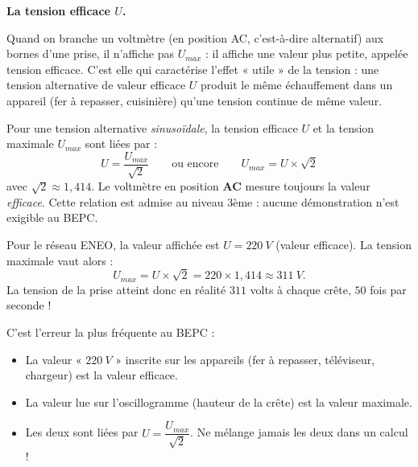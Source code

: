 \documentclass[11pt]{article}
\newcommand{\cle}[1]{{\popxbold\color{popdark}#1}}
\begin{document}
\textbf{La tension efficace $U$.}\par
Quand on branche un voltmètre (en position AC, c'est-à-dire alternatif) aux bornes d'une prise, il n'affiche pas $U_{max}$ : il affiche une valeur plus petite, appelée \cle{tension efficace}. C'est elle qui caractérise l'effet « utile » de la tension : une tension alternative de valeur efficace $U$ produit le même échauffement dans un appareil (fer à repasser, cuisinière) qu'une tension continue de même valeur.

\begin{propriete}
Pour une tension alternative \emph{sinusoïdale}, la tension efficace $U$ et la tension maximale $U_{max}$ sont liées par :
\[ U = \frac{U_{max}}{\sqrt{2}} \qquad \text{ou encore} \qquad U_{max} = U \times \sqrt{2} \]
avec $\sqrt{2} \approx 1,414$. Le voltmètre en position \textbf{AC} mesure toujours la valeur \emph{efficace}. Cette relation est admise au niveau 3ème : aucune démonstration n'est exigible au BEPC.
\end{propriete}

\begin{exemplebox}
Pour le réseau ENEO, la valeur affichée est $U = \SI{220}{V}$ (valeur efficace). La tension maximale vaut alors :
\[ U_{max} = U \times \sqrt{2} = 220 \times 1,414 \approx \SI{311}{V}. \]
La tension de la prise atteint donc en réalité $311$ volts à chaque crête, $50$ fois par seconde !
\end{exemplebox}

\begin{attention}
C'est l'erreur la plus fréquente au BEPC :
\begin{itemize}
\item La valeur « $\SI{220}{V}$ » inscrite sur les appareils (fer à repasser, téléviseur, chargeur) est la valeur \cle{efficace}.
\item La valeur lue sur l'oscillogramme (hauteur de la crête) est la valeur \cle{maximale}.
\item Les deux sont liées par $U = \dfrac{U_{max}}{\sqrt{2}}$. Ne mélange jamais les deux dans un calcul !
\end{itemize}
\end{attention}
\end{document}
